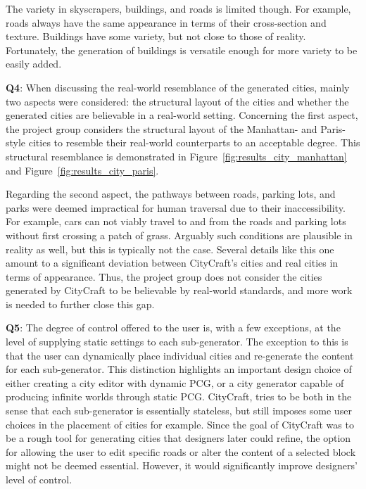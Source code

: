 The variety in skyscrapers, buildings, and roads is limited though.
For example, roads always have the same appearance in terms of their cross-section and texture.
Buildings have some variety, but not close to those of reality.
Fortunately, the generation of buildings is versatile enough for more variety to be easily added.

\textbf{Q4}:
When discussing the real-world resemblance of the generated cities, mainly two aspects were considered: the structural layout of the cities and whether the generated cities are believable in a real-world setting. 
Concerning the first aspect, the project group considers the structural layout of the Manhattan- and Paris-style cities to resemble their real-world counterparts to an acceptable degree.
This structural resemblance is demonstrated in Figure~\ref{fig:results_city_manhattan} and Figure~\ref{fig:results_city_paris}.

Regarding the second aspect, the pathways between roads, parking lots, and parks were deemed impractical for human traversal due to their inaccessibility.
For example, cars can not viably travel to and from the roads and parking lots without first crossing a patch of grass.
Arguably such conditions are plausible in reality as well, but this is typically not the case.
Several details like this one amount to a significant deviation between CityCraft's cities and real cities in terms of appearance.
Thus, the project group does not consider the cities generated by CityCraft to be believable by real-world standards, and more work is needed to further close this gap.

\textbf{Q5}:
The degree of control offered to the user is, with a few exceptions, at the level of supplying static settings to each sub-generator.
The exception to this is that the user can dynamically place individual cities and re-generate the content for each sub-generator.
This distinction highlights an important design choice of either creating a city editor with dynamic PCG, or a city generator capable of producing infinite worlds through static PCG.
CityCraft, tries to be both in the sense that each sub-generator is essentially stateless, but still imposes some user choices in the placement of cities for example.
Since the goal of CityCraft was to be a rough tool for generating cities that designers later could refine, the option for allowing the user to edit specific roads or alter the content of a selected block might not be deemed essential.
However, it would significantly improve designers' level of control.

